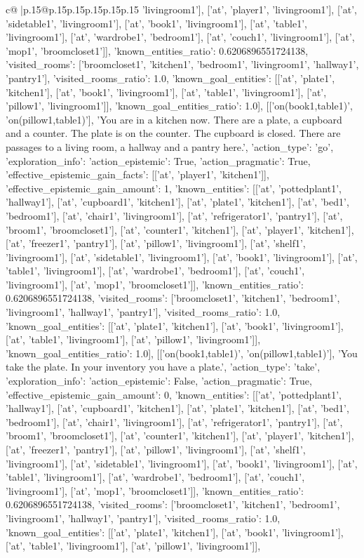 \documentclass{article}
\begin{document}
{\begin{supertabular}{c@{$\;$}|p{.15\linewidth}@{}p{.15\linewidth}p{.15\linewidth}p{.15\linewidth}p{.15\linewidth}p{.15\linewidth}}
{{{'livingroom1'], ['at', 'player1', 'livingroom1'], ['at', 'sidetable1', 'livingroom1'], ['at', 'book1', 'livingroom1'], ['at', 'table1', 'livingroom1'], ['at', 'wardrobe1', 'bedroom1'], ['at', 'couch1', 'livingroom1'], ['at', 'mop1', 'broomcloset1']], 'known_entities_ratio': 0.6206896551724138, 'visited_rooms': ['broomcloset1', 'kitchen1', 'bedroom1', 'livingroom1', 'hallway1', 'pantry1'], 'visited_rooms_ratio': 1.0, 'known_goal_entities': [['at', 'plate1', 'kitchen1'], ['at', 'book1', 'livingroom1'], ['at', 'table1', 'livingroom1'], ['at', 'pillow1', 'livingroom1']], 'known_goal_entities_ratio': 1.0}}], [['on(book1,table1)', 'on(pillow1,table1)'], 'You are in a kitchen now. There are a plate, a cupboard and a counter. The plate is on the counter. The cupboard is closed. There are passages to a living room, a hallway and a pantry here.', {'action_type': 'go', 'exploration_info': {'action_epistemic': True, 'action_pragmatic': True, 'effective_epistemic_gain_facts': [['at', 'player1', 'kitchen1']], 'effective_epistemic_gain_amount': 1, 'known_entities': [['at', 'pottedplant1', 'hallway1'], ['at', 'cupboard1', 'kitchen1'], ['at', 'plate1', 'kitchen1'], ['at', 'bed1', 'bedroom1'], ['at', 'chair1', 'livingroom1'], ['at', 'refrigerator1', 'pantry1'], ['at', 'broom1', 'broomcloset1'], ['at', 'counter1', 'kitchen1'], ['at', 'player1', 'kitchen1'], ['at', 'freezer1', 'pantry1'], ['at', 'pillow1', 'livingroom1'], ['at', 'shelf1', 'livingroom1'], ['at', 'sidetable1', 'livingroom1'], ['at', 'book1', 'livingroom1'], ['at', 'table1', 'livingroom1'], ['at', 'wardrobe1', 'bedroom1'], ['at', 'couch1', 'livingroom1'], ['at', 'mop1', 'broomcloset1']], 'known_entities_ratio': 0.6206896551724138, 'visited_rooms': ['broomcloset1', 'kitchen1', 'bedroom1', 'livingroom1', 'hallway1', 'pantry1'], 'visited_rooms_ratio': 1.0, 'known_goal_entities': [['at', 'plate1', 'kitchen1'], ['at', 'book1', 'livingroom1'], ['at', 'table1', 'livingroom1'], ['at', 'pillow1', 'livingroom1']], 'known_goal_entities_ratio': 1.0}}], [['on(book1,table1)', 'on(pillow1,table1)'], 'You take the plate. In your inventory you have a plate.', {'action_type': 'take', 'exploration_info': {'action_epistemic': False, 'action_pragmatic': True, 'effective_epistemic_gain_amount': 0, 'known_entities': [['at', 'pottedplant1', 'hallway1'], ['at', 'cupboard1', 'kitchen1'], ['at', 'plate1', 'kitchen1'], ['at', 'bed1', 'bedroom1'], ['at', 'chair1', 'livingroom1'], ['at', 'refrigerator1', 'pantry1'], ['at', 'broom1', 'broomcloset1'], ['at', 'counter1', 'kitchen1'], ['at', 'player1', 'kitchen1'], ['at', 'freezer1', 'pantry1'], ['at', 'pillow1', 'livingroom1'], ['at', 'shelf1', 'livingroom1'], ['at', 'sidetable1', 'livingroom1'], ['at', 'book1', 'livingroom1'], ['at', 'table1', 'livingroom1'], ['at', 'wardrobe1', 'bedroom1'], ['at', 'couch1', 'livingroom1'], ['at', 'mop1', 'broomcloset1']], 'known_entities_ratio': 0.6206896551724138, 'visited_rooms': ['broomcloset1', 'kitchen1', 'bedroom1', 'livingroom1', 'hallway1', 'pantry1'], 'visited_rooms_ratio': 1.0, 'known_goal_entities': [['at', 'plate1', 'kitchen1'], ['at', 'book1', 'livingroom1'], ['at', 'table1', 'livingroom1'], ['at', 'pillow1', 'livingroom1']], }}}
\end{supertabular}}
\end{document}
